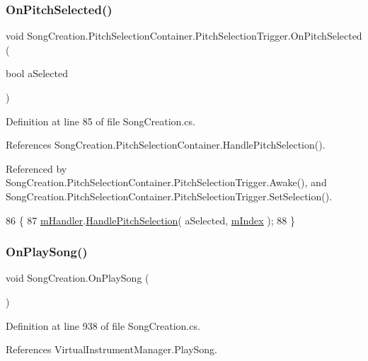 \subsubsection{\texorpdfstring{On\+Pitch\+Selected()}{OnPitchSelected()}}
{\footnotesize\ttfamily void Song\+Creation.\+Pitch\+Selection\+Container.\+Pitch\+Selection\+Trigger.\+On\+Pitch\+Selected (\begin{DoxyParamCaption}\item[{bool}]{a\+Selected }\end{DoxyParamCaption})}



Definition at line 85 of file Song\+Creation.\+cs.



References Song\+Creation.\+Pitch\+Selection\+Container.\+Handle\+Pitch\+Selection().



Referenced by Song\+Creation.\+Pitch\+Selection\+Container.\+Pitch\+Selection\+Trigger.\+Awake(), and Song\+Creation.\+Pitch\+Selection\+Container.\+Pitch\+Selection\+Trigger.\+Set\+Selection().


\begin{DoxyCode}
86             \{
87                 \hyperlink{group___s_c_handlers_gaad92d071482ccc179c9a40cada09785b}{mHandler}.\hyperlink{group___s_c_handlers_gac87a7591bbd41276ff2ea28b7698b30c}{HandlePitchSelection}( aSelected, 
      \hyperlink{group___s_c_handlers_ga6fa7a0883292035fef62858a69044010}{mIndex} );
88             \}
\end{DoxyCode}
\mbox{\label{group___s_c_handlers_gab333656dbc41fbebb320a30c48501370}} 
\subsubsection{\texorpdfstring{On\+Play\+Song()}{OnPlaySong()}}
{\footnotesize\ttfamily void Song\+Creation.\+On\+Play\+Song (\begin{DoxyParamCaption}{ }\end{DoxyParamCaption})}



Definition at line 938 of file Song\+Creation.\+cs.



References Virtual\+Instrument\+Manager.\+Play\+Song.



